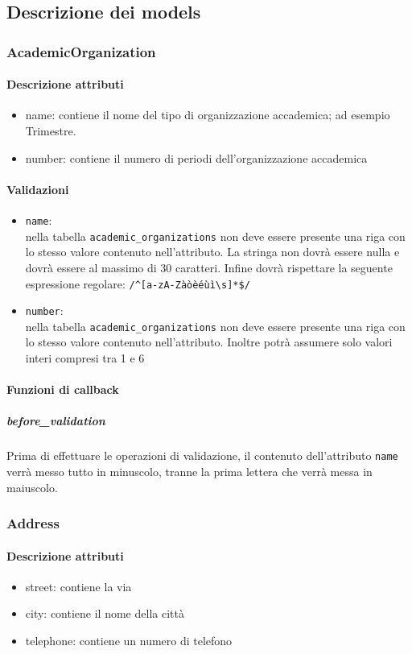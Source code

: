 \documentclass[11pt,a4paper]{article}
\begin{document}
\subsection{Descrizione dei models}
\subsubsection{AcademicOrganization}
\paragraph{Descrizione attributi}
\begin{itemize}
 \item name: contiene il nome del tipo di organizzazione accademica; ad esempio Trimestre.
 \item number: contiene il numero di periodi dell'organizzazione accademica
\end{itemize}

\paragraph{Validazioni}
\begin{itemize}
 \item \verb|name|:\\ nella tabella \verb|academic_organizations| non deve essere presente una riga con lo stesso valore contenuto nell'attributo. La stringa non dovrà essere nulla e dovrà essere al massimo di 30 caratteri. Infine dovrà rispettare la seguente espressione regolare: \verb|/^[a-zA-Zàòèéùì\s]*$/|
\item \verb|number|:\\ nella tabella \verb|academic_organizations| non deve essere presente una riga con lo stesso valore contenuto nell'attributo. Inoltre potrà assumere solo valori interi compresi tra 1 e 6
\end{itemize}
\paragraph{Funzioni di callback}
\subparagraph{before\_validation}
Prima di effettuare le operazioni di validazione, il contenuto dell'attributo \verb|name| verrà messo tutto in minuscolo, tranne la prima lettera che verrà messa in maiuscolo. 
\subsubsection{Address}
\paragraph{Descrizione attributi}
\begin{itemize}
 \item street: contiene la via  
 \item city: contiene il nome della città
 \item telephone: contiene un numero di telefono
\end{itemize}
\end{document}
